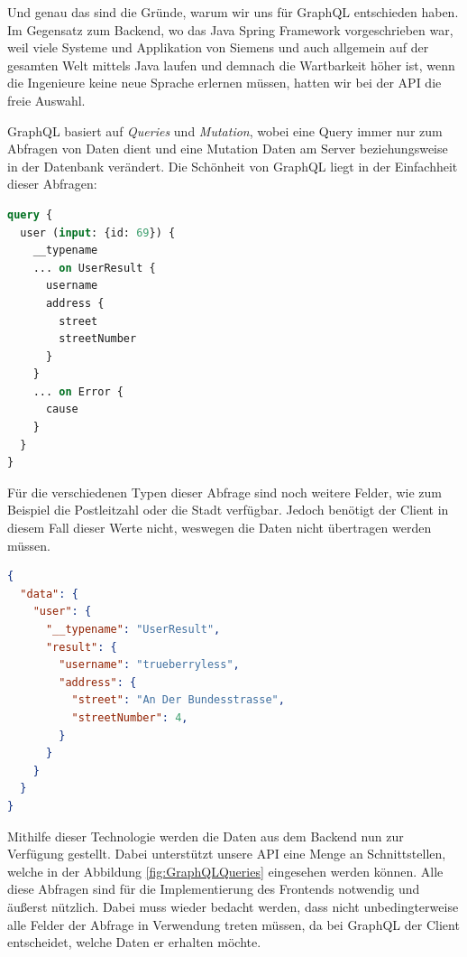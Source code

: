 Und genau das sind die Gründe, warum wir uns für GraphQL entschieden haben. Im Gegensatz zum Backend, wo das Java Spring Framework vorgeschrieben war, weil viele Systeme und Applikation von Siemens und auch allgemein auf der gesamten Welt mittels Java laufen und demnach die Wartbarkeit höher ist, wenn die Ingenieure keine neue Sprache erlernen müssen, hatten wir bei der API die freie Auswahl.

GraphQL basiert auf \emph{Queries} und \emph{Mutation}, wobei eine Query immer nur zum Abfragen von Daten dient und eine Mutation Daten am Server beziehungsweise in der Datenbank verändert. Die Schönheit von GraphQL liegt in der Einfachheit dieser Abfragen: \cite{GraphQLQueriesAndMutations}

\begin{lstlisting}[language={graphql},caption={Beispiel einer GraphQL-Abfrage},captionpos=b]
query {
  user (input: {id: 69}) {
    __typename
    ... on UserResult {
      username
      address {
        street
        streetNumber
      }
    }
    ... on Error {
      cause
    }
  }
}
\end{lstlisting}

Für die verschiedenen Typen dieser Abfrage sind noch weitere Felder, wie zum Beispiel die Postleitzahl oder die Stadt verfügbar. Jedoch benötigt der Client in diesem Fall dieser Werte nicht, weswegen die Daten nicht übertragen werden müssen. 

\begin{lstlisting}[language={json},caption={Rückgabe einer GraphQL-Abfrage},captionpos=b]
{
  "data": {
    "user": {
      "__typename": "UserResult",
      "result": {
        "username": "trueberryless",
        "address": {
          "street": "An Der Bundesstrasse",
          "streetNumber": 4,
        }
      }
    }
  }
}
\end{lstlisting}

Mithilfe dieser Technologie werden die Daten aus dem Backend nun zur Verfügung gestellt. Dabei unterstützt unsere API eine Menge an Schnittstellen, welche in der Abbildung \ref{fig:GraphQLQueries} eingesehen werden können. Alle diese Abfragen sind für die Implementierung des Frontends notwendig und äußerst nützlich. Dabei muss wieder bedacht werden, dass nicht unbedingterweise alle Felder der Abfrage in Verwendung treten müssen, da bei GraphQL der Client entscheidet, welche Daten er erhalten möchte. \cite{GraphQLWhyGraphQL}

